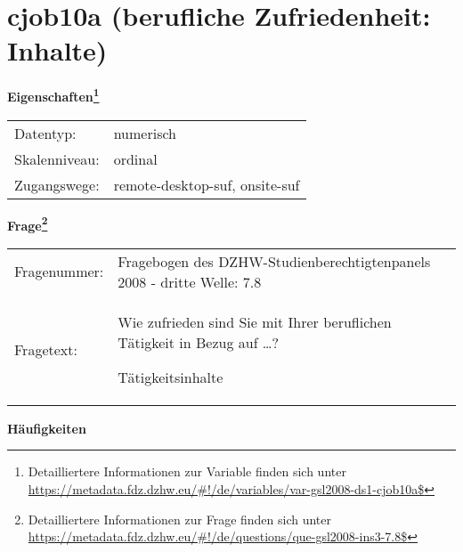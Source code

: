 
    \setcounter{footnote}{0}

    \vspace*{-1.8cm}
	\section{cjob10a (berufliche Zufriedenheit: Inhalte)}
	\label{section:cjob10a}



    \vspace*{0.5cm}
    \noindent\textbf{Eigenschaften\footnote{Detailliertere Informationen zur Variable finden sich unter
		\url{https://metadata.fdz.dzhw.eu/\#!/de/variables/var-gsl2008-ds1-cjob10a$}}}\\
	\begin{tabularx}{\hsize}{@{}lX}
	Datentyp: & numerisch \\
	Skalenniveau: & ordinal \\
	Zugangswege: &
	  remote-desktop-suf, 
	  onsite-suf
 \\
    \end{tabularx}



				\vspace*{0.5cm}
                \noindent\textbf{Frage\footnote{Detailliertere Informationen zur Frage finden sich unter
		              \url{https://metadata.fdz.dzhw.eu/\#!/de/questions/que-gsl2008-ins3-7.8$}}}\\
				\begin{tabularx}{\hsize}{@{}lX}
					Fragenummer: &
					  Fragebogen des DZHW-Studienberechtigtenpanels 2008 - dritte Welle:
					  7.8
 \\
					Fragetext: & Wie zufrieden sind Sie mit Ihrer beruflichen Tätigkeit in Bezug auf …?\par  Tätigkeitsinhalte \\
				\end{tabularx}





        		\vspace*{0.5cm}
                \noindent\textbf{Häufigkeiten}

